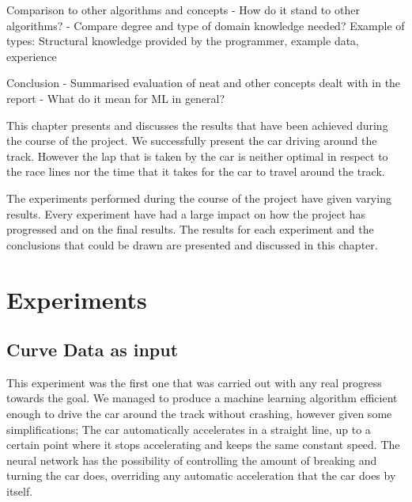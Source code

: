 Comparison to other algorithms and concepts
- How do it stand to other algorithms?
- Compare degree and type of domain knowledge needed? Example of types: Structural knowledge provided by the programmer, example data, experience


Conclusion
- Summarised evaluation of neat and other concepts dealt with in the report
- What do it mean for ML in general?



\iffalse

This chapter presents and discusses the results that have been achieved during the course of the project. We successfully present the car driving around the track. However the lap that is taken by the car is neither optimal in respect to the race lines nor the time that it takes for the car to travel around the track.

The experiments performed during the course of the project have given varying results. Every experiment have had a large impact on how the project has progressed and on the final results. The results for each experiment and the conclusions that could be drawn are presented and discussed in this chapter.

\section{Experiments}

\subsection{Curve Data as input}
This experiment was the first one that was carried out with any real progress towards the goal. We managed to produce a machine learning algorithm efficient enough to drive the car around the track without crashing, however given some simplifications; The car automatically accelerates in a straight line, up to a certain point where it stops accelerating and keeps the same constant speed. The neural network has the possibility of controlling the amount of breaking and turning the car does, overriding any automatic acceleration that the car does by itself.


